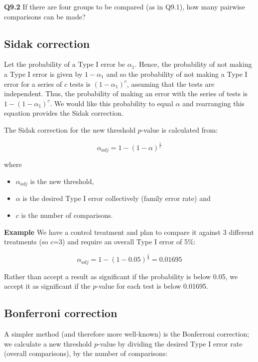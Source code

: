 \documentclass[
  oneside]{krantz}
\providecommand{\tightlist}{%
  \setlength{\itemsep}{0pt}\setlength{\parskip}{0pt}}
\begin{document}
\textbf{Q9.2} If there are four groups to be compared (as in Q9.1), how many pairwise comparisons can be made?

\hypertarget{sidak-correction}{%
\subsection{Sidak correction}\label{sidak-correction}}

Let the probability of a Type I error be \(\alpha_1\). Hence, the probability of not making a Type I error is given by \(1 - \alpha_1\) and so the probability of not making a Type I error for a series of \(c\) tests is \((1 - \alpha_1)^c\), assuming that the tests are independent. Thus, the probability of making an error with the series of tests is \(1 - (1 - \alpha_1)^c\). We would like this probability to equal \(\alpha\) and rearranging this equation provides the Sidak correction.

The Sidak correction for the new threshold \(p\)-value is calculated from:

\[\alpha_{adj} = 1 - (1-\alpha)^{\frac{1}{c}}\]

where

\begin{itemize}
\tightlist
\item
  \(\alpha_{adj}\) is the new threshold,
\item
  \(\alpha\) is the desired Type I error collectively (family error rate) and
\item
  \(c\) is the number of comparisons.
\end{itemize}

\textbf{Example} We have a control treatment and plan to compare it against 3 different treatments (so \(c\)=3) and require an overall Type I error of 5\%:

\[\alpha_{adj} = 1 - (1 - 0.05)^{\frac{1}{3}}=0.01695\]

Rather than accept a result as significant if the probability is below 0.05, we accept it as significant if the \(p\)-value for each test is below 0.01695.

\hypertarget{bonferroni-correction}{%
\subsection{Bonferroni correction}\label{bonferroni-correction}}

A simpler method (and therefore more well-known) is the Bonferroni correction; we calculate a new threshold \(p\)-value by dividing the desired Type I error rate (overall comparisons), by the number of comparisons:
\end{document}
